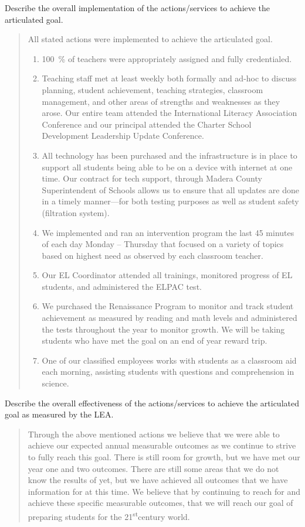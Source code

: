 \documentclass{article}
\newcommand{\st}{\textsuperscript{st}}
\newcounter{goal}[section] %
\newcounter{action}[goal]
\newenvironment{actionanalysis}
	{
		\begin{enumerate}[{\bf {Action} 1:}]
	}
	{
		\end{enumerate}
	}
\begin{document}
Describe the overall implementation of the actions/services to achieve the articulated goal.
\begin{quotation}
	All stated actions were implemented to achieve the articulated goal.
	\begin{actionanalysis}
	\item \SI{100}{\percent} of teachers were appropriately assigned and fully credentialed.
	\item Teaching staff met at least weekly both formally and ad-hoc to discuss planning, student achievement, teaching strategies, classroom management, and other areas of strengths and weaknesses as they arose. Our entire team attended the International Literacy Association Conference and our principal attended the Charter School Development Leadership Update Conference.
	\item All technology has been purchased and the infrastructure is in place to support all students being able to be on a device with internet at one time. Our contract for tech support, through Madera County Superintendent of Schools allows us to ensure that all updates are done in a timely manner---for both testing purposes as well as student safety (filtration system).
	\item We implemented and ran an intervention program the last 45 minutes of each day Monday -- Thursday that focused on a variety of topics based on highest need as observed by each classroom teacher.
	\item Our EL Coordinator attended all trainings, monitored progress of EL students, and administered the ELPAC test.
	\item We purchased the Renaissance Program to monitor and track student achievement as measured by reading and math levels and administered the tests throughout the year to monitor growth. We will be taking students who have met the goal on an end of year reward trip.
	\item One of our classified employees works with students as a classroom aid each morning, assisting students with questions and comprehension in science.
	\end{actionanalysis}
\end{quotation}

Describe the overall effectiveness of the actions/services to achieve the articulated goal as measured by the LEA.
\begin{quotation}
	Through the above mentioned actions we believe that we were able to achieve our expected annual measurable outcomes as we continue to strive to fully reach this goal. There is still room for growth, but we have met our year one and two outcomes. There are still some areas that we do not know the results of yet, but we have achieved all outcomes that we have information for at this time. We believe that by continuing to reach for and achieve these specific measurable outcomes, that we will reach our goal of preparing students for the 21\st century world.
\end{quotation}
\end{document}
